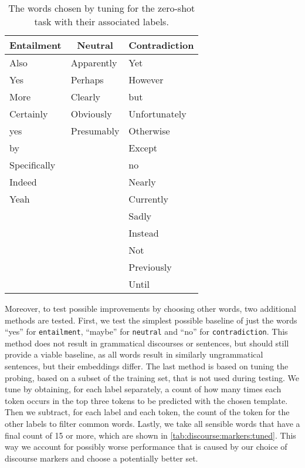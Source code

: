 \begin{table}[ht]
    \centering
    \caption{The words chosen by tuning for the zero-shot task with their associated labels.}
    \small
    \begin{tabular}{l | l | l}
        \multicolumn{1}{c|}{Entailment} & \multicolumn{1}{c|}{Neutral} & \multicolumn{1}{c}{Contradiction} \\
        \hline
        Also & Apparently & Yet \\
        Yes & Perhaps & However \\
        More & Clearly & but \\
        Certainly & Obviously & Unfortunately \\
        yes & Presumably & Otherwise \\
        by &  & Except \\
        Specifically &  & no \\
        Indeed &  & Nearly \\
        Yeah &  & Currently \\
        &  & Sadly \\
        &  & Instead \\
        &  & Not \\
        &  & Previously \\
        &  & Until \\
    \end{tabular}
    \label{tab:discourse:markers:tuned}
\end{table}

Moreover, to test possible improvements by choosing other words, two additional methods are tested. First, we test the simplest possible baseline of just the words \enquote{yes} for \texttt{entailment}, \enquote{maybe} for \texttt{neutral} and \enquote{no} for \texttt{contradiction}. This method does not result in grammatical discourses or sentences, but should still provide a viable baseline, as all words result in similarly ungrammatical sentences, but their embeddings differ. The last method is based on tuning the probing, based on a subset of the training set, that is not used during testing. We tune by obtaining, for each label separately, a count of how many times each token occurs in the top three tokens to be predicted with the chosen template. Then we subtract, for each label and each token, the count of the token for the other labels to filter common words. Lastly, we take all sensible words that have a final count of 15 or more, which are shown in \autoref{tab:discourse:markers:tuned}. This way we account for possibly worse performance that is caused by our choice of discourse markers and choose a potentially better set.

